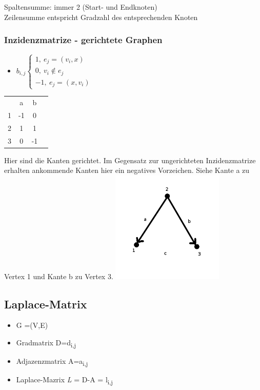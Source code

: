 Spaltensumme: immer 2 (Start- und Endknoten)\\
Zeilensumme entspricht Gradzahl des entsprechenden Knoten

\subsubsection{Inzidenzmatrize - gerichtete Graphen}
\begin{itemize}
	\item $b_{i,j}
	\begin{cases}
		1,\>e_j=(v_i,x)\\
		0,\>v_i \notin e_j\\
		-1,\>e_j=(x,v_i)\end{cases}$
\end{itemize}

\begin{tabular}{cccc}
 & a & b\\
1 & -1 & 0\\
2 & 1 & 1\\
3 & 0 & -1\\
\end{tabular}\newline\newline
Hier sind die Kanten gerichtet. Im Gegensatz zur ungerichteten Inzidenzmatrize erhalten \glqq ankommende\grqq{} Kanten hier ein negatives Vorzeichen. Siehe Kante a zu Vertex 1 und Kante b zu Vertex 3.\newline
\includegraphics[width=0.4\textwidth]{lectures/161028/pix/dreieckge.png}

\newpage

\subsection{Laplace-Matrix}
\begin{itemize}
	\item G =(V,E)
	\item Gradmatrix D=d\textsubscript{i,j}
	\item Adjazenzmatrix A=a\textsubscript{i,j}
	\item Laplace-Mazrix \textit L = D-A = l\textsubscript{i,j}
\end{itemize}

